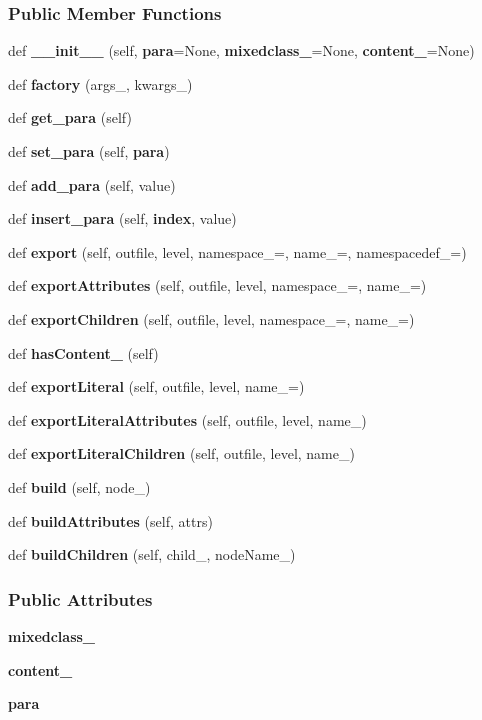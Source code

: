\subsubsection*{Public Member Functions}
\begin{DoxyCompactItemize}
\item 
def {\bf \+\_\+\+\_\+init\+\_\+\+\_\+} (self, {\bf para}=None, {\bf mixedclass\+\_\+}=None, {\bf content\+\_\+}=None)
\item 
def {\bf factory} (args\+\_\+, kwargs\+\_\+)
\item 
def {\bf get\+\_\+para} (self)
\item 
def {\bf set\+\_\+para} (self, {\bf para})
\item 
def {\bf add\+\_\+para} (self, value)
\item 
def {\bf insert\+\_\+para} (self, {\bf index}, value)
\item 
def {\bf export} (self, outfile, level, namespace\+\_\+=\textquotesingle{}\textquotesingle{}, name\+\_\+=\textquotesingle{}, namespacedef\+\_\+=\textquotesingle{}\textquotesingle{})
\item 
def {\bf export\+Attributes} (self, outfile, level, namespace\+\_\+=\textquotesingle{}\textquotesingle{}, name\+\_\+=\textquotesingle{})
\item 
def {\bf export\+Children} (self, outfile, level, namespace\+\_\+=\textquotesingle{}\textquotesingle{}, name\+\_\+=\textquotesingle{})
\item 
def {\bf has\+Content\+\_\+} (self)
\item 
def {\bf export\+Literal} (self, outfile, level, name\+\_\+=\textquotesingle{})
\item 
def {\bf export\+Literal\+Attributes} (self, outfile, level, name\+\_\+)
\item 
def {\bf export\+Literal\+Children} (self, outfile, level, name\+\_\+)
\item 
def {\bf build} (self, node\+\_\+)
\item 
def {\bf build\+Attributes} (self, attrs)
\item 
def {\bf build\+Children} (self, child\+\_\+, node\+Name\+\_\+)
\end{DoxyCompactItemize}
\subsubsection*{Public Attributes}
\begin{DoxyCompactItemize}
\item 
{\bf mixedclass\+\_\+}
\item 
{\bf content\+\_\+}
\item 
{\bf para}
\end{DoxyCompactItemize}
